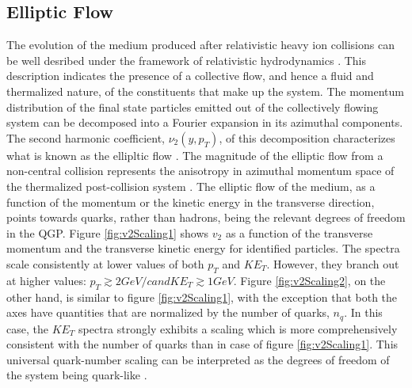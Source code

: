 \subsection{Elliptic Flow}
The evolution of the medium produced after relativistic heavy ion collisions can be well desribed under the framework of relativistic hydrodynamics \cite{SCHENKE2017105,2014NuPhA.926...92S}. This description indicates the presence of a collective flow, and hence a fluid and thermalized nature, of the constituents that make up the system. The momentum distribution of the final state particles emitted out of the collectively flowing system can be decomposed into a Fourier expansion in its azimuthal components. The second harmonic coefficient, $\nu_{2}(y,p_{T})$, of this decomposition characterizes what is known as the ellipltic flow \cite{2001PhLB..503...58H}. The magnitude of the elliptic flow from a non-central collision represents the anisotropy in azimuthal momentum space of the thermalized post-collision system \cite{2011NJPh...13e5008S}.
The elliptic flow of the medium, as a function of the momentum or the kinetic energy in the transverse direction, points towards quarks, rather than hadrons, being the relevant degrees of freedom in the QGP. Figure \ref{fig:v2Scaling1} shows $v_{2}$ as a function of the transverse momentum and the transverse kinetic energy for identified particles. The spectra scale consistently at lower values of both $p_{T}$ and $KE_{T}$. However, they branch out at higher values: $p_{T} \gtrsim 2 GeV/c and KE_{T} \gtrsim 1 GeV$. Figure \ref{fig:v2Scaling2}, on the other hand, is similar to figure \ref{fig:v2Scaling1}, with the exception that both the axes have quantities that are normalized by the number of quarks, $n_{q}$. In this case, the $KE_{T}$ spectra strongly exhibits a scaling which is more comprehensively consistent with the number of quarks than in case of figure \ref{fig:v2Scaling1}. This universal quark-number scaling can be interpreted as the degrees of freedom of the system being quark-like \cite{2007PhRvL..98p2301A}.
